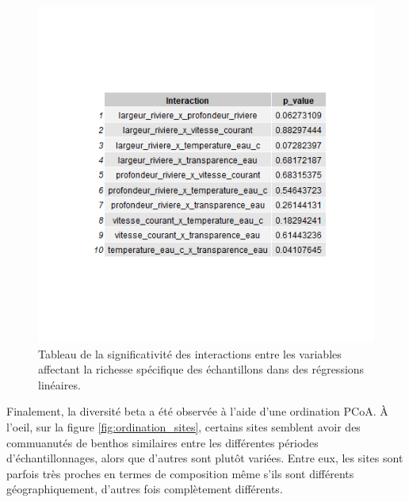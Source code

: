 \documentclass[9pt,twocolumn,twoside,]{pnas-new}
\begin{document}
\begin{figure}
\centering
\includegraphics{tableau_interaction.png}
\caption{Tableau de la significativité des interactions entre les
variables affectant la richesse spécifique des échantillons dans des
régressions linéaires. \label{fig:tableau_interaction}}
\end{figure}

Finalement, la diversité beta a été observée à l'aide d'une ordination
PCoA. À l'oeil, sur la figure \ref{fig:ordination_sites}, certains sites
semblent avoir des commuanutés de benthos similaires entre les
différentes périodes d'échantillonnages, alors que d'autres sont plutôt
variées. Entre eux, les sites sont parfois très proches en termes de
composition même s'ils sont différents géographiquement, d'autres fois
complètement différents.
\end{document}
